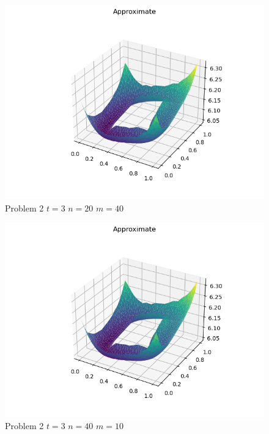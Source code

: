 \documentclass{report}
\begin{document}
\begin{figure}[h]
	\caption{Problem 2 $t = 3$ $n = 20$ $m = 40$}
	\includegraphics[width=\textwidth]{example.png}
\end{figure}
\begin{figure}[h]
	\caption{Problem 2 $t = 3$ $n = 40$ $m = 10$}
	\includegraphics[width=\textwidth]{example.png}
\end{figure}
\end{document}
